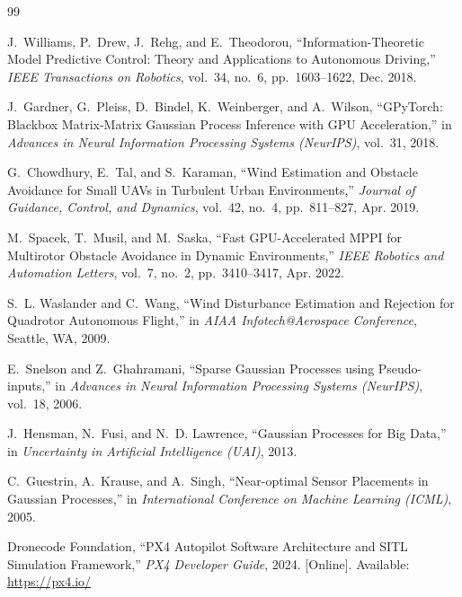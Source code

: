 \documentclass[12pt,a4paper,oneside]{report}
\begin{document}
\begin{thebibliography}{99}

J.~Williams, P.~Drew, J.~Rehg, and E.~Theodorou, ``Information-Theoretic Model Predictive Control: Theory and Applications to Autonomous Driving,'' \emph{IEEE Transactions on Robotics}, vol.~34, no.~6, pp.~1603--1622, Dec. 2018.

J.~Gardner, G.~Pleiss, D.~Bindel, K.~Weinberger, and A.~Wilson, ``GPyTorch: Blackbox Matrix-Matrix Gaussian Process Inference with GPU Acceleration,'' in \emph{Advances in Neural Information Processing Systems (NeurIPS)}, vol.~31, 2018.

G.~Chowdhury, E.~Tal, and S.~Karaman, ``Wind Estimation and Obstacle Avoidance for Small UAVs in Turbulent Urban Environments,'' \emph{Journal of Guidance, Control, and Dynamics}, vol.~42, no.~4, pp.~811--827, Apr. 2019.

M.~Spacek, T.~Musil, and M.~Saska, ``Fast GPU-Accelerated MPPI for Multirotor Obstacle Avoidance in Dynamic Environments,'' \emph{IEEE Robotics and Automation Letters}, vol.~7, no.~2, pp.~3410--3417, Apr. 2022.

S.~L. Waslander and C.~Wang, ``Wind Disturbance Estimation and Rejection for Quadrotor Autonomous Flight,'' in \emph{AIAA Infotech@Aerospace Conference}, Seattle, WA, 2009.

E.~Snelson and Z.~Ghahramani, ``Sparse Gaussian Processes using Pseudo-inputs,'' in \emph{Advances in Neural Information Processing Systems (NeurIPS)}, vol.~18, 2006.

J.~Hensman, N.~Fusi, and N.~D. Lawrence, ``Gaussian Processes for Big Data,'' in \emph{Uncertainty in Artificial Intelligence (UAI)}, 2013.

C.~Guestrin, A.~Krause, and A.~Singh, ``Near-optimal Sensor Placements in Gaussian Processes,'' in \emph{International Conference on Machine Learning (ICML)}, 2005.

Dronecode Foundation, ``PX4 Autopilot Software Architecture and SITL Simulation Framework,'' \emph{PX4 Developer Guide}, 2024. [Online]. Available: \url{https://px4.io/}

\end{thebibliography}
\end{document}
